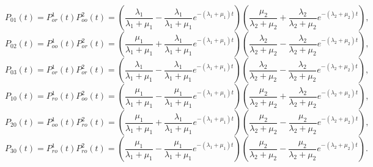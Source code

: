 \documentclass{amsart}
\theoremstyle{plain}
\theoremstyle{definition}
\begin{document}
\[P_{01}(t) = P^1_{or}(t)P^2_{oo}(t) = \left(\frac{\lambda_1}{\lambda_1 + \mu_1} - \frac{\lambda_1}{\lambda_1 + \mu_1}e^{-(\lambda_1 + \mu_1)t}\right) \left(\frac{\mu_2}{\lambda_2 + \mu_2} + \frac{\lambda_2}{\lambda_2 + \mu_2}e^{-(\lambda_2 + \mu_2)t}\right), \]
\[P_{02}(t) = P^1_{oo}(t)P^2_{or}(t) = \left(\frac{\mu_1}{\lambda_1 + \mu_1} + \frac{\lambda_1}{\lambda_1 + \mu_1}e^{-(\lambda_1 + \mu_1)t} \right)\left(\frac{\lambda_2}{\lambda_2 + \mu_2} - \frac{\lambda_2}{\lambda_2 + \mu_2}e^{-(\lambda_2 + \mu_2)t}\right),
\]
\[P_{03}(t) = P^1_{or}(t)P^2_{or}(t) =\left(\frac{\lambda_1}{\lambda_1 + \mu_1} - \frac{\lambda_1}{\lambda_1 + \mu_1}e^{-(\lambda_1 + \mu_1)t}\right)
\left(\frac{\lambda_2}{\lambda_2 + \mu_2} - \frac{\lambda_2}{\lambda_2 + \mu_2}e^{-(\lambda_2 + \mu_2)t}\right),\]
\[P_{10}(t) = P^1_{ro}(t)P^2_{oo}(t) = \left(\frac{\mu_1}{\lambda_1 + \mu_1} - \frac{\mu_1}{\lambda_1 + \mu_1}e^{-(\lambda_1 + \mu_1)t} \right)\left( \frac{\mu_2}{\lambda_2 + \mu_2} + \frac{\lambda_2}{\lambda_2 + \mu_2}e^{-(\lambda_2 + \mu_2)t}\right),
\]
\[P_{20}(t) = P^1_{oo}(t)P^2_{ro}(t) = \left(\frac{\mu_1}{\lambda_1 + \mu_1} + \frac{\lambda_1}{\lambda_1 + \mu_1}e^{-(\lambda_1 + \mu_1)t}\right)\left( \frac{\mu_2}{\lambda_2 + \mu_2} - \frac{\mu_2}{\lambda_2 + \mu_2}e^{-(\lambda_2 + \mu_2)t}\right),
\]
\[P_{30}(t) = P^1_{ro}(t)P^2_{ro}(t) =\left(\frac{\mu_1}{\lambda_1 + \mu_1} - \frac{\mu_1}{\lambda_1 + \mu_1}e^{-(\lambda_1 + \mu_1)t}\right)\left(\frac{\mu_2}{\lambda_2 + \mu_2} - \frac{\mu_2}{\lambda_2 + \mu_2}e^{-(\lambda_2 + \mu_2)t} \right). \]
\end{document}
